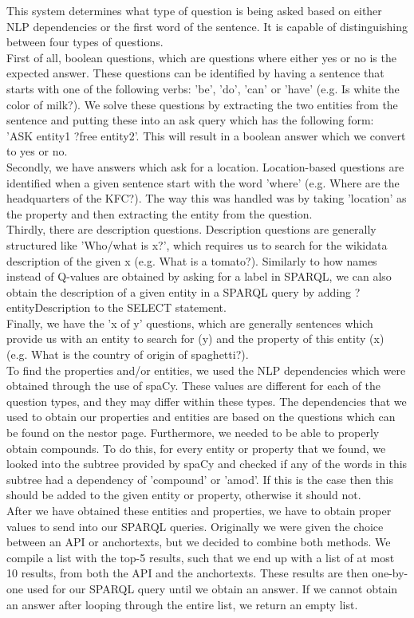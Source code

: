 \documentclass{article}
\begin{document}
This system determines what type of question is being asked based on either NLP dependencies or the first word of the sentence. It is capable of distinguishing between four types of questions.\\
First of all, boolean questions, which are questions where either yes or no is the expected answer. These questions can be identified by having a sentence that starts with one of the following verbs: 'be', 'do', 'can' or 'have' (e.g. Is white the color of milk?). We solve these questions by extracting the two entities from the sentence and putting these into an ask query which has the following form:\\
'ASK{ entity1 ?free entity2}'. This will result in a boolean answer which we convert to yes or no.\\
Secondly, we have answers which ask for a location. Location-based questions are identified when a given sentence start with the word 'where' (e.g. Where are the headquarters of the KFC?). The way this was handled was by taking 'location' as the property and then extracting the entity from the question.\\
Thirdly, there are description questions. Description questions are generally structured like 'Who/what is x?', which requires us to search for the wikidata description of the given x (e.g. What is a tomato?). Similarly to how names instead of Q-values are obtained by asking for a label in SPARQL, we can also obtain the description of a given entity in a SPARQL query by adding ?entityDescription to the SELECT statement.\\
Finally, we have the 'x of y' questions, which are generally sentences which provide us with an entity to search for (y) and the property of this entity (x) (e.g. What is the country of origin of spaghetti?).\\
To find the properties and/or entities, we used the NLP dependencies which were obtained through the use of spaCy. These values are different for each of the question types, and they may differ within these types. The dependencies that we used to obtain our properties and entities are based on the questions which can be found on the nestor page. Furthermore, we needed to be able to properly obtain compounds. To do this, for every entity or property that we found, we looked into the subtree provided by spaCy and checked if any of the words in this subtree had a dependency of 'compound' or 'amod'. If this is the case then this should be added to the given entity or property, otherwise it should not.\\
After we have obtained these entities and properties, we have to obtain proper values to send into our SPARQL queries. Originally we were given the choice between an API or anchortexts, but we decided to combine both methods. We compile a list with the top-5 results, such that we end up with a list of at most 10 results, from both the API and the anchortexts. These results are then one-by-one used for our SPARQL query until we obtain an answer. If we cannot obtain an answer after looping through the entire list, we return an empty list.\\
\end{document}
